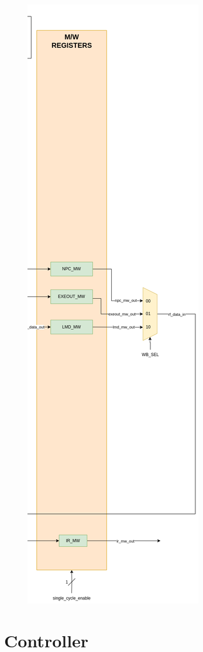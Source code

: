 \begin{figure}
\begin{minipage}{.5\textwidth}
  \includegraphics[height=1.80\linewidth]{images/writeback_stage.png}
  \label{fig:writeback_stage}
\end{minipage}
\end{figure}

\section{Controller}\label{controller_ch}

